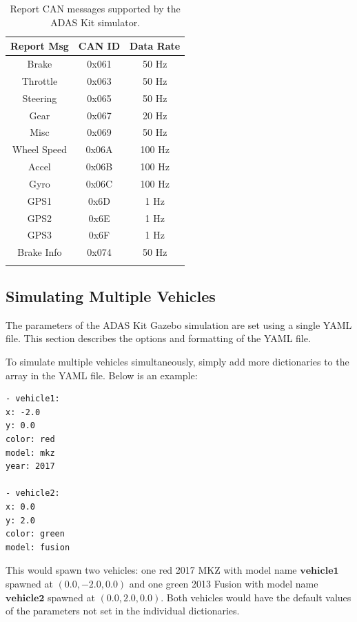 \begin{table}[h!]
\centering
\begin{tabular}{c c c} 
 \hline
Report Msg & CAN ID & Data Rate \\ [0.5ex] 
 \hline
Brake & 0x061 & 50 Hz \\
Throttle & 0x063 &  50 Hz \\
Steering & 0x065 & 50 Hz \\
Gear & 0x067 & 20 Hz \\
Misc & 0x069 & 50 Hz \\
Wheel Speed & 0x06A & 100 Hz \\
Accel & 0x06B & 100 Hz \\
Gyro & 0x06C & 100 Hz \\
GPS1 & 0x6D & 1 Hz \\ 
GPS2 & 0x6E & 1 Hz \\
GPS3 & 0x6F & 1 Hz \\
Brake Info & 0x074 & 50 Hz \\ [1ex]
 \hline \\
\end{tabular}
\caption{Report CAN messages supported by the ADAS Kit simulator.}
\label{table:dbw3}
\end{table}


\subsection{Simulating Multiple Vehicles}

The parameters of the ADAS Kit Gazebo simulation are set using a single YAML file. This section describes the options and formatting of the YAML file.

To simulate multiple vehicles simultaneously, simply add more dictionaries to the array in the YAML file. Below is an example:

\begin{lstlisting}[language=XML]
- vehicle1: 
x: -2.0
y: 0.0
color: red
model: mkz
year: 2017

- vehicle2:
x: 0.0
y: 2.0
color: green
model: fusion
\end{lstlisting}

This would spawn two vehicles: one red 2017 MKZ with model name $\textbf{vehicle1}$ spawned at $(0.0, -2.0, 0.0)$ and one green 2013 Fusion with model name $\textbf{vehicle2}$ spawned at $(0.0, 2.0, 0.0)$. Both vehicles would have the default values of the parameters not set in the individual dictionaries.



%


